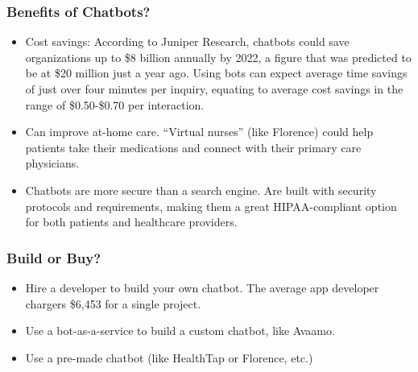 \begin{frame}[fragile]\frametitle{Benefits of Chatbots?}

\begin{itemize}
\item Cost savings: According to Juniper Research, chatbots could save organizations up to \$8 billion annually by 2022, a figure that was predicted to be at \$20 million just a year ago. Using bots can expect average time savings of just over four minutes per inquiry, equating to average cost savings in the range of \$0.50-\$0.70 per interaction.
\item Can improve at-home care.  ``Virtual nurses'' (like Florence) could help patients take their medications and connect with their primary care physicians.
\item Chatbots are more secure than a search engine. Are built with security protocols and requirements, making them a great HIPAA-compliant option for both patients and healthcare providers.
\end{itemize}


\end{frame}

\begin{frame}[fragile]\frametitle{Build or Buy?}

\begin{itemize}
\item Hire a developer to build your own chatbot. The average app developer chargers \$6,453 for a single project.
\item Use a bot-as-a-service to build a custom chatbot, like Avaamo.
\item Use a pre-made chatbot (like HealthTap or Florence, etc.)
\end{itemize}


\end{frame}